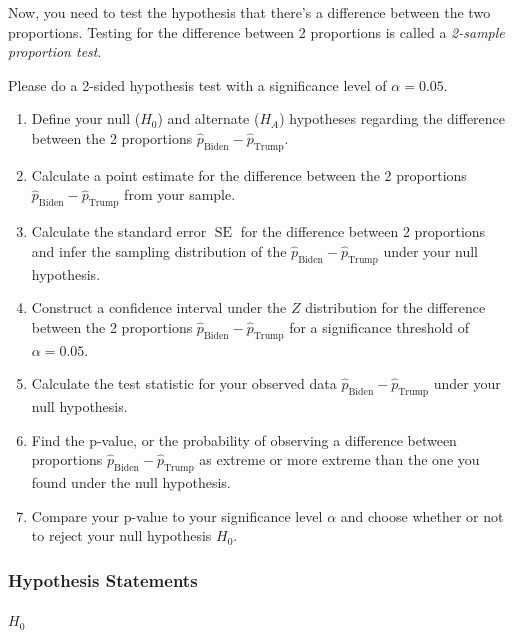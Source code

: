 \documentclass[
  letterpaper,
  DIV=11,
  numbers=noendperiod]{scrartcl}
\makeatletter
\let\oldparagraph\paragraph
\renewcommand{\paragraph}{
    \@ifstar
      \xxxParagraphStar
      \xxxParagraphNoStar
  }
\newcommand{\xxxParagraphStar}[1]{\oldparagraph*{#1}\mbox{}}
\newcommand{\xxxParagraphNoStar}[1]{\oldparagraph{#1}\mbox{}}
\makeatother
\begin{document}
Now, you need to test the hypothesis that there's a difference between
the two proportions. Testing for the difference between 2 proportions is
called a \emph{2-sample proportion test}.

Please do a 2-sided hypothesis test with a significance level of
\(\alpha=0.05\).

\begin{enumerate}
\def\labelenumi{\arabic{enumi}.}
\item
  Define your null (\(H_0\)) and alternate (\(H_A\)) hypotheses
  regarding the difference between the 2 proportions
  \(\hat{p}_{\text{Biden}}-\hat{p}_{\text{Trump}}\).
\item
  Calculate a point estimate for the difference between the 2
  proportions \(\hat{p}_{\text{Biden}}-\hat{p}_{\text{Trump}}\) from
  your sample.
\item
  Calculate the standard error \(\operatorname{SE}\) for the difference
  between 2 proportions and infer the sampling distribution of the
  \(\hat{p}_{\text{Biden}}-\hat{p}_{\text{Trump}}\) under your null
  hypothesis.
\item
  Construct a confidence interval under the \(Z\) distribution for the
  difference between the 2 proportions
  \(\hat{p}_{\text{Biden}}-\hat{p}_{\text{Trump}}\) for a significance
  threshold of \(\alpha=0.05\).
\item
  Calculate the test statistic for your observed data
  \(\hat{p}_{\text{Biden}}-\hat{p}_{\text{Trump}}\) under your null
  hypothesis.
\item
  Find the p-value, or the probability of observing a difference between
  proportions \(\hat{p}_{\text{Biden}}-\hat{p}_{\text{Trump}}\) as
  extreme or more extreme than the one you found under the null
  hypothesis.
\item
  Compare your p-value to your significance level \(\alpha\) and choose
  whether or not to reject your null hypothesis \(H_0\).
\end{enumerate}

\subsubsection{Hypothesis Statements}\label{hypothesis-statements}

\paragraph{\texorpdfstring{\(H_0\)}{H\_0}}\label{h_0}
\end{document}
